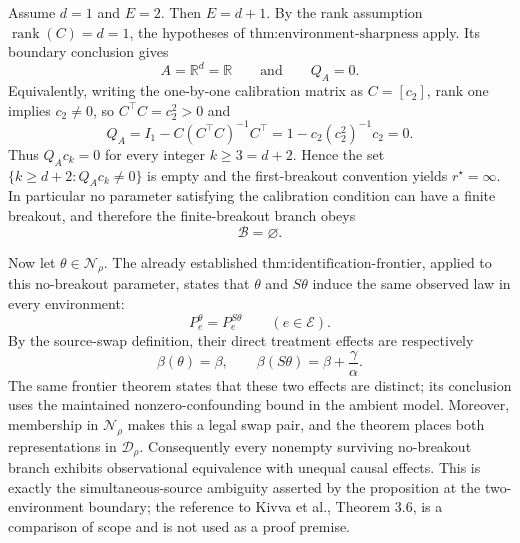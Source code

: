 Assume \(d=1\) and \(E=2\).  Then \(E=d+1\).  By the rank assumption \(\operatorname{rank}(C)=d=1\), the hypotheses of \(\text{thm:environment-sharpness}\) apply.  Its boundary conclusion gives
\[
A=\mathbb R^d=\mathbb R
\qquad\text{and}\qquad
Q_A=0.
\]
Equivalently, writing the one-by-one calibration matrix as \(C=[c_2]\), rank one implies \(c_2\ne0\), so \(C^\top C=c_2^2>0\) and
\[
Q_A
=I_1-C(C^\top C)^{-1}C^\top
=1-c_2(c_2^2)^{-1}c_2
=0.
\]
Thus \(Q_Ac_k=0\) for every integer \(k\ge3=d+2\).  Hence the set \(\{k\ge d+2:Q_Ac_k\ne0\}\) is empty and the first-breakout convention yields \(r^\star=\infty\).  In particular no parameter satisfying the calibration condition can have a finite breakout, and therefore the finite-breakout branch obeys
\[
\mathcal B=\varnothing.
\]

Now let \(\theta\in\mathcal N_\rho\).  The already established \(\text{thm:identification-frontier}\), applied to this no-breakout parameter, states that \(\theta\) and \(S\theta\) induce the same observed law in every environment:
\[
P_e^{\theta}=P_e^{S\theta}
\qquad(e\in\mathcal E).
\]
By the source-swap definition, their direct treatment effects are respectively
\[
\beta(\theta)=\beta,
\qquad
\beta(S\theta)=\beta+\frac{\gamma}{\alpha}.
\]
The same frontier theorem states that these two effects are distinct; its conclusion uses the maintained nonzero-confounding bound in the ambient model.  Moreover, membership in \(\mathcal N_\rho\) makes this a legal swap pair, and the theorem places both representations in \(\mathcal D_\rho\).  Consequently every nonempty surviving no-breakout branch exhibits observational equivalence with unequal causal effects.  This is exactly the simultaneous-source ambiguity asserted by the proposition at the two-environment boundary; the reference to Kivva et al., Theorem 3.6, is a comparison of scope and is not used as a proof premise.
